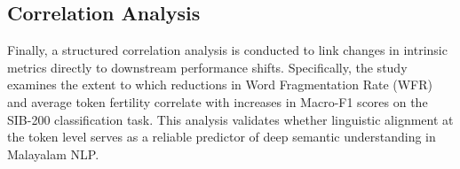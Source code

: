 \documentclass[12pt]{article}
\begin{document}
\subsection{Correlation Analysis}

Finally, a structured correlation analysis is conducted to link changes in intrinsic metrics directly to downstream performance shifts. Specifically, the study examines the extent to which reductions in Word Fragmentation Rate (WFR) and average token fertility correlate with increases in Macro-F1 scores on the SIB-200 classification task. This analysis validates whether linguistic alignment at the token level serves as a reliable predictor of deep semantic understanding in Malayalam NLP.


\newpage
\printbibliography
\end{document}
